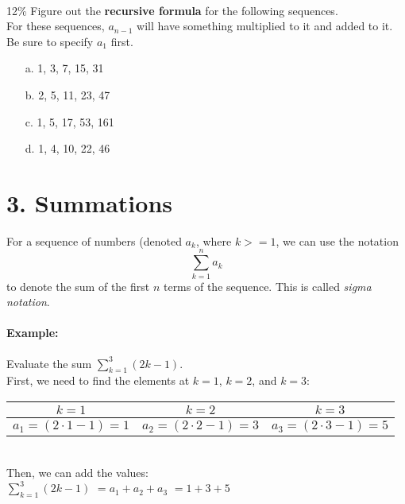 \documentclass[a4paper,12pt]{book}
\begin{document}
        ~\\
        \begin{question}{8}{12\%}
            Figure out the \textbf{recursive formula} for the following sequences. \\
            For these sequences, $a_{n-1}$ will have something multiplied
            to it and added to it.
            Be sure to specify $a_{1}$ first.

            \begin{itemize}
                \item[a.] 1, 3, 7, 15, 31
                \item[b.] 2, 5, 11, 23, 47
                \item[c.] 1, 5, 17, 53, 161
                \item[d.] 1, 4, 10, 22, 46
            \end{itemize}
        \end{question}

    \newpage
    \section*{3. Summations}
        \begin{introNOHEAD}
            For a sequence of numbers (denoted $a_{k}$, where $k >= 1$,
            we can use the notation
            $$\sum_{k=1}^{n} a_{k}$$
            to denote the sum of the first $n$ terms of the sequence.
            This is called \textit{sigma notation}.

            \paragraph{Example:} Evaluate the sum $\sum_{k=1}^{3}(2k-1)$. ~\\
            First, we need to find the elements at $k=1$, $k=2$, and $k=3$:

            \begin{center}
                \begin{tabular}{| c | c | c |}
                    \hline
                    \textbf{ $k=1$ } & \textbf{ $k=2$ } & \textbf{ $k=3$ } \\
                    \hline
                    $a_{1} = (2 \cdot 1 - 1) = 1$ &
                    $a_{2} = (2 \cdot 2 - 1) = 3$ &
                    $a_{3} = (2 \cdot 3 - 1) = 5$
                    \\
                    \hline
                \end{tabular}
            \end{center}
            ~\\
            Then, we can add the values: \\
            $\sum_{k=1}^{3}(2k-1) $ \tab
            $= a_{1} + a_{2} + a_{3}$ \tab
            $= 1 + 3 + 5 $ \tab
        \end{introNOHEAD}
        
\end{document}
